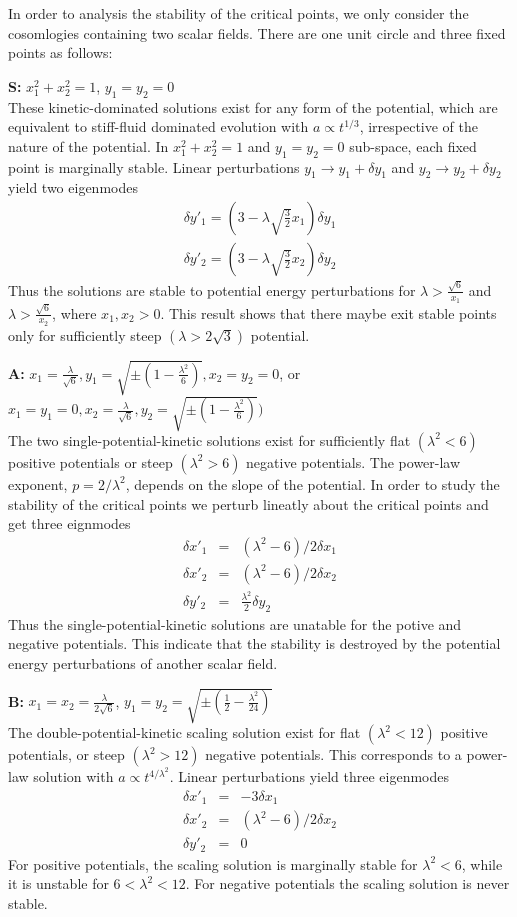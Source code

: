 \documentclass[a4paper,12pt]{article}
\begin{document}
In order to analysis the stability of the critical points, we only
consider the cosomlogies containing two scalar fields. There are
one unit circle and three fixed points as follows:

\textbf{S:} $x_1^2+x_2^2=1$, $y_1=y_2=0$ \\
These kinetic-dominated solutions exist for any form of the
potential, which are equivalent to stiff-fluid dominated evolution
with $a\propto t^{1/3}$, irrespective of the nature of the
potential. In $x_1^2+x_2^2=1$ and $y_1=y_2=0$ sub-space, each
fixed point is marginally stable. Linear perturbations $y_1\to
y_1+\delta y_1$ and $y_2\to y_2+\delta y_2$ yield two eigenmodes
\begin{eqnarray*}
\delta y'_1=(3-\lambda \sqrt{\frac{3}{2}}x_1)\delta y_1 \\
\delta y'_2=(3-\lambda \sqrt{\frac{3}{2}}x_2)\delta y_2
\end{eqnarray*}
Thus the solutions are stable to potential energy perturbations
for $\lambda >\frac{\sqrt{6}}{x_1}$ and $\lambda
>\frac{\sqrt{6}}{x_2}$, where $x_1,x_2>0$. This result shows that
there maybe exit stable points only for sufficiently steep
$(\lambda >2\sqrt{3})$ potential.

\textbf{A:} $x_1=\frac{\lambda}{\sqrt{6}},y_1=\sqrt{\pm (1-\frac{\lambda
^2}{6})},x_2=y_2=0$,
or
$x_1=y_1=0,x_2=\frac{\lambda}{\sqrt{6}},y_2=\sqrt{\pm (1-\frac{\lambda
^2}{6})})$ \\
The two single-potential-kinetic solutions exist for sufficiently
flat $(\lambda ^2<6)$ positive potentials or steep $(\lambda
^2>6)$ negative potentials. The power-law exponent, $p=2/\lambda
^2$, depends on the slope of the potential. In order to study the
stability of the critical points we perturb lineatly about the
critical points and get three eignmodes
\begin{eqnarray*}
\delta x'_1&=&(\lambda ^2-6)/2\delta x_1 \\
\delta x'_2&=&(\lambda ^2-6)/2\delta x_2 \\
\delta y'_2&=&\frac{\lambda ^2}{2}\delta y_2
\end{eqnarray*}
Thus the single-potential-kinetic solutions are unatable for the
potive and negative potentials. This indicate that the stability
is destroyed by the potential energy perturbations of another
scalar field.

\textbf{B:} $x_1=x_2=\frac{\lambda}{2\sqrt{6}}$,
$y_1=y_2=\sqrt{\pm
(\frac{1}{2}-\frac{\lambda ^2}{24})}$ \\
The double-potential-kinetic scaling solution exist for flat
$(\lambda ^2<12)$ positive potentials, or steep $(\lambda ^2>12)$
negative potentials. This corresponds to a power-law solution with
$a\propto t^{4/\lambda ^2}$. Linear perturbations yield three
eigenmodes
\begin{eqnarray*}
\delta x'_1&=&-3\delta x_1 \\
\delta x'_2&=&(\lambda ^2-6)/2\delta x_2 \\
\delta y'_2&=&0
\end{eqnarray*}
For positive potentials, the scaling solution is marginally stable
for $\lambda ^2<6$, while it is unstable for $6<\lambda ^2<12$.
For negative potentials the scaling solution is never stable.
\end{document}
